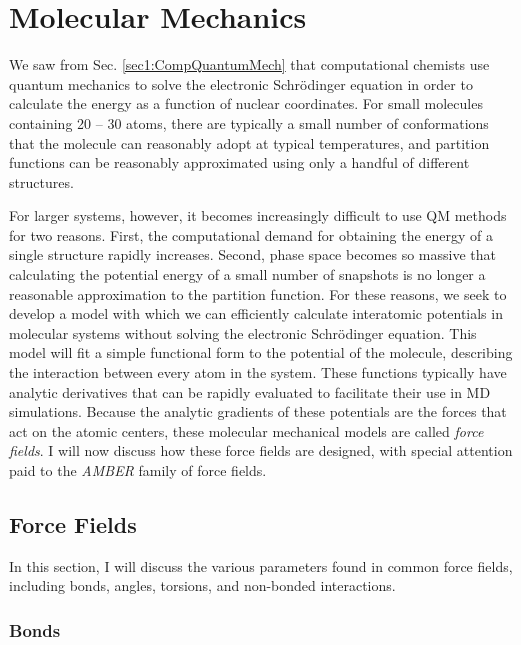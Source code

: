 \section{Molecular Mechanics}

We saw from Sec. \ref{sec1:CompQuantumMech} that computational chemists use
quantum mechanics to solve the electronic Schr\"odinger equation in order to
calculate the energy as a function of nuclear coordinates. For small molecules
containing 20 -- 30 atoms, there are typically a small number of conformations
that the molecule can reasonably adopt at typical temperatures, and partition
functions can be reasonably approximated using only a handful of different
structures.

For larger systems, however, it becomes increasingly difficult to use QM methods
for two reasons. First, the computational demand for obtaining the energy of a
single structure rapidly increases. Second, phase space becomes so massive that
calculating the potential energy of a small number of snapshots is no longer a
reasonable approximation to the partition function. For these reasons, we seek
to develop a model with which we can efficiently calculate interatomic
potentials in molecular systems without solving the electronic Schr\"odinger
equation. This model will fit a simple functional form to the potential of the
molecule, describing the interaction between every atom in the system.  These
functions typically have analytic derivatives that can be rapidly evaluated to
facilitate their use in MD simulations. Because the analytic gradients of these
potentials are the forces that act on the atomic centers, these molecular
mechanical models are called \emph{force fields}. I will now discuss how these
force fields are designed, with special attention paid to the \emph{AMBER}
family of force fields.

\subsection{Force Fields}

In this section, I will discuss the various parameters found in common force
fields, including bonds, angles, torsions, and non-bonded interactions.

\subsubsection{Bonds}
\label{sec1:Bond}

